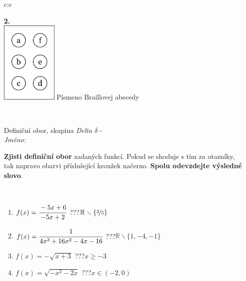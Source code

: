 \documentclass[10pt]{report}
\begin{document}
\begin{tabular}{c:c}
\begin{minipage}[c][104.5mm][t]{0.5\linewidth}
\begin{center}
\begin{minipage}{0.20\linewidth}
\begin{center}
{\Huge\bfseries 2.} \\[2mm]
\includegraphics[height=40mm]{../images/braille.png}
{\small Písmeno Braillovej abecedy}
\end{center}
\end{minipage}
\end{center}
\end{minipage}
\\ \hdashline
\begin{minipage}[c][104.5mm][t]{0.5\linewidth}
\begin{center}
\vspace{7mm}
{\huge Definiční obor, skupina \textit{Delta $\delta$} -}\\[5mm]
\textit{Jméno:}\phantom{xxxxxxxxxxxxxxxxxxxxxxxxxxxxxxxxxxxxxxxxxxxxxxxxxxxxxxxxxxxxxxxxx}\\[5mm]
\begin{minipage}{0.95\linewidth}
\begin{center}
\textbf{Zjisti definiční obor} zadaných funkcí. Pokud se shoduje s tím za otazníky,\\tak napravo obarvi příslušející kroužek načerno. \textbf{Spolu odevzdejte výsledné slovo}.
\end{center}
\end{minipage}
\\[1mm]
\begin{minipage}{0.79\linewidth}
\begin{center}
\begin{varwidth}{\linewidth}
\begin{enumerate}
\normalsizerrr
\item $f(x)=\cfrac{-5x+6}{-5x+2}$\quad \dotfill\; ???\;\dotfill \quad $\mathbb{R}\smallsetminus\{\nicefrac{2}{5}\}$
\item $f(x)=\cfrac{1}{4x^3+16x^2-4x-16}$\quad \dotfill\; ???\;\dotfill \quad $\mathbb{R}\smallsetminus\{1,-4,-1\}$
\item $f(x)=-\sqrt{x+3}$\quad \dotfill\; ???\;\dotfill \quad $x\geq-3$
\item $f(x)=\sqrt{-x^2-2x}$\quad \dotfill\; ???\;\dotfill \quad $x\in(-2 , 0)$

\end{enumerate}
\end{varwidth}
\end{center}
\end{minipage}
\end{center}
\end{minipage}
\end{tabular}
\end{document}
